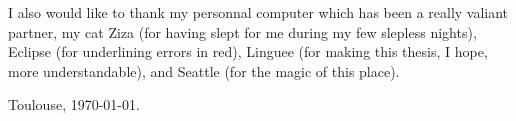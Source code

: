 I also would like to thank my personnal computer which has been a really valiant partner, 
my cat Ziza (for having slept for me during my few slepless nights),
Eclipse (for underlining errors in red), 
Linguee (for making this thesis, I hope, more understandable),
and Seattle (for the magic of this place).


\vspace{2cm}

\hfill Toulouse, \today.
